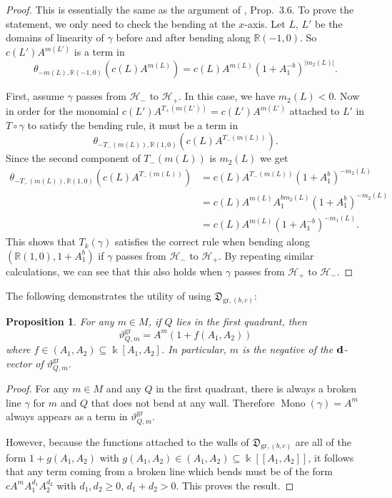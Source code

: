 \documentclass[11pt]{amsart}
\newtheorem{prop}[theorem]{Proposition}
\theoremstyle{remark}
\numberwithin{equation}{section}
\newcommand{\RR}{\mathbb{R}}
\newcommand{\fD}{\mathfrak{D}}
\newcommand{\gr}{\mathrm{gr}}
\newcommand{\Mono}{\operatorname{Mono}}
\begin{document}
\begin{proof}
  This is essentially the same as the argument of \cite{GHKK}, Prop.\ 3.6.  To
  prove the statement, we only need to check the bending at the $x$-axis. Let
  $L$, $L'$ be the domains of linearity of $\gamma$ before and after bending
  along $\RR (-1,0)$. So $c(L') A^{m(L')}$ is a term in 
  \[
    \theta_{-m(L),\RR(-1,0)} \left(c(L) A^{m(L)}\right)
    = 
    c(L) A^{m(L)} \left(1+A_1^{-b}\right) ^{|m_2(L)|}.
  \]

  First, assume $\gamma$ passes from $\mathcal{H}_-$ to $\mathcal{H}_+$. In this
  case, we have $m_2(L) < 0$. Now in order for the monomial
  $c(L')A^{T_+(m(L'))} =c(L')A^{m(L')}$ attached to $L'$ in
  $T\circ\gamma$ to satisfy the bending rule, it must be a term in
  \[
    \theta_{-T_-(m(L)),\RR (1,0)} \left(c(L) A^{T_-(m(L))}\right). 
  \]
  Since the second component of $T_-(m(L))$ is $m_2(L)$ we get
  \begin{align*} 
    \theta_{-T_-(m(L)),\RR (1,0)} \left(c(L) A^{T_-(m(L))}\right) 
    & =
    c(L) A^{T_-(m(L))} \left(1+A_1^b\right) ^{-m_2(L)}
    \\
    & = 
    c(L) A^{m(L)} A_1^{b m_2(L)} 
    \left(1+A_1^b\right)^{-m_2(L)} 
    \\
    & = 
    c(L) A^{m(L)} \left(1+A_1^{-b}\right) ^{-m_1(L)}.
  \end{align*}
  This shows that $T_k(\gamma)$ satisfies the correct rule when bending along
  $(\RR (1,0), 1+A_1^b)$ if $\gamma$ passes from $\mathcal{H}_-$ to
  $\mathcal{H}_+$. By repeating similar calculations, we can see that this also
  holds when $\gamma$ passes from $\mathcal{H}_+$ to $\mathcal{H}_-$.
\end{proof}

The following demonstrates the utility of using $\fD_{\gr,(b,c)}$:

\begin{prop}
  For any  $m\in M$, if $Q$ lies in the first quadrant, then 
  \[
    \vartheta^{\gr}_{Q, m}=A^{m}\left(1+f(A_1,A_2)\right)
  \]
  where $f\in (A_1,A_2)\subseteq \Bbbk[A_1,A_2]$.
  In particular, $m$ is the negative of the ${\bf d}$-vector of
  $\vartheta^{\gr}_{Q,m}$.
\end{prop}

\begin{proof}
  For any $m\in M$ and any $Q$ in the first quadrant, there is always a broken
  line $\gamma$ for $m$ and $Q$ that does not bend at any wall. Therefore $\Mono
  (\gamma) = A^{m}$ always appears as a term in $\vartheta^{\gr}_{Q,m}$.

  However, because the functions attached to the walls of
  $\fD_{\gr,(b,c)}$ are all of the form $1+g(A_1,A_2)$ with $g(A_1,A_2) \in
  (A_1,A_2) \subseteq \Bbbk[[A_1,A_2]]$, it follows that any term coming from a
  broken line which bends must be of the form $cA^{m}A_1^{d_1}A_2^{d_2}$ with
  $d_1,d_2\ge 0$, $d_1+d_2>0$. This proves the result.
\end{proof}
\end{document}
